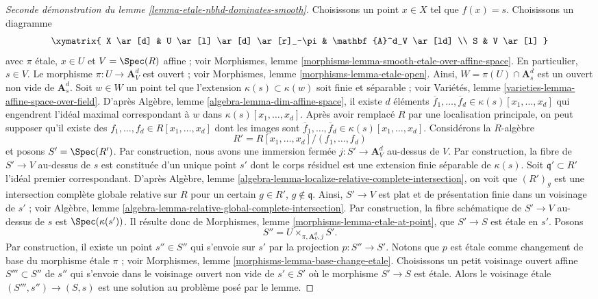\begin{proof}[Seconde démonstration du lemme \ref{lemma-etale-nbhd-dominates-smooth}]
Choisissons un point $x \in X$ tel que $f(x) = s$.
Choisissons un diagramme
$$
\xymatrix{
X \ar[d] & U \ar[l] \ar[d] \ar[r]_-\pi & \mathbf{A}^d_V \ar[ld] \\
S & V \ar[l]
}
$$
avec $\pi$ \'etale, $x \in U$ et $V = \Spec(R)$ affine ; voir
Morphismes, lemme \ref{morphisms-lemma-smooth-etale-over-affine-space}.
En particulier, $s \in V$. Le morphisme
$\pi : U \to \mathbf{A}^d_V$ est ouvert ; voir
Morphismes, lemme \ref{morphisms-lemma-etale-open}.
Ainsi, $W = \pi(U) \cap \mathbf{A}^d_s$ est un ouvert non vide de
$\mathbf{A}^d_s$. Soit $w \in W$ un point tel que l'extension $\kappa(s) \subset \kappa(w)$
soit finie et séparable ; voir
Variétés, lemme \ref{varieties-lemma-affine-space-over-field}.
D'après
Algèbre, lemme \ref{algebra-lemma-dim-affine-space},
il existe $d$ éléments
$\overline{f}_1, \ldots, \overline{f}_d \in \kappa(s)[x_1, \ldots, x_d]$
qui engendrent l'idéal maximal correspondant à $w$ dans
$\kappa(s)[x_1, \ldots, x_d]$.
Après avoir remplacé $R$ par une localisation principale,
on peut supposer qu'il existe des $f_1, \ldots, f_d \in R[x_1, \ldots, x_d]$
dont les images sont
$\overline{f}_1, \ldots, \overline{f}_d \in \kappa(s)[x_1, \ldots, x_d]$.
Considérons la $R$-algèbre
$$
R' = R[x_1, \ldots, x_d]/(f_1, \ldots, f_d)
$$
et posons $S' = \Spec(R')$. Par construction, nous avons une
immersion fermée $j : S' \to \mathbf{A}^d_V$ au-dessus de $V$.
Par construction, la fibre de $S' \to V$ au-dessus de $s$ est constituée d'un unique
point $s'$ dont le corps résiduel est une extension finie séparable de $\kappa(s)$.
Soit $\mathfrak q' \subset R'$ l'idéal premier correspondant. D'après
Algèbre, lemme \ref{algebra-lemma-localize-relative-complete-intersection},
on voit que $(R')_g$ est une intersection complète globale relative sur $R$
pour un certain $g \in R'$, $g \not \in \mathfrak q$.
Ainsi, $S' \to V$ est plat et de présentation finie dans un
voisinage de $s'$ ; voir
Algèbre, lemme \ref{algebra-lemma-relative-global-complete-intersection}.
Par construction, la fibre schématique
de $S' \to V$ au-dessus de $s$ est $\Spec(\kappa(s'))$. Il résulte donc de
Morphismes, lemme \ref{morphisms-lemma-etale-at-point},
que $S' \to S$ est \'etale en $s'$. Posons
$$
S'' = U \times_{\pi, \mathbf{A}^d_V, j} S'.
$$
Par construction, il existe un point $s'' \in S''$ qui s'envoie sur
$s'$ par la projection $p : S'' \to S'$. Notons que $p$ est \'etale
comme changement de base du morphisme \'etale $\pi$ ; voir
Morphismes, lemme \ref{morphisms-lemma-base-change-etale}.
Choisissons un petit voisinage ouvert affine $S''' \subset S''$ de $s''$
qui s'envoie dans le voisinage ouvert non vide de $s' \in S'$
où le morphisme $S' \to S$ est \'etale. Alors le voisinage \'etale
$(S''', s'') \to (S, s)$ est une solution au problème posé par le lemme.
\end{proof}

